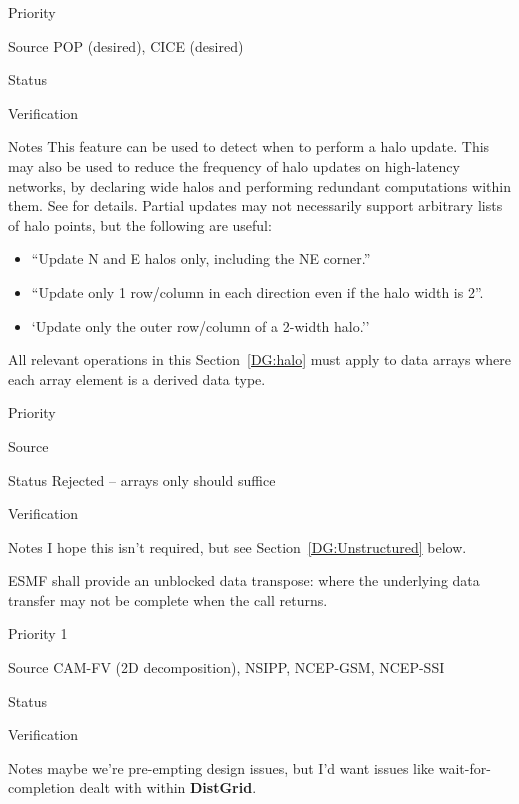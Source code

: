 \begin{reqlist}
\item[Priority]
\item[Source] POP (desired), CICE (desired)
\item[Status]
\item[Verification]
\item[Notes] This feature can be used to detect when to perform a halo
  update. This may also be used to reduce the frequency of halo
  updates on high-latency networks, by declaring wide halos and
  performing redundant computations within them. See \cite{ref:b2001}
  for details. Partial updates may not necessarily support
  arbitrary lists of halo points, but the following are useful:
  \begin{itemize}
  \item ``Update N and E halos only, including the NE corner.''
  \item ``Update only 1 row/column in each direction even if the halo
    width is 2''.
  \item `Update only the outer row/column of a 2-width halo.''
  \end{itemize}
\end{reqlist}


All relevant operations in this Section~\ref{DG:halo} must apply to
data arrays where each array element is a derived data type.

\begin{reqlist}
\item[Priority]
\item[Source]
\item[Status] Rejected -- arrays only should suffice
\item[Verification]
\item[Notes] I hope this isn't required, but see
  Section~\ref{DG:Unstructured} below.
\end{reqlist}

 \label{DG:transpose}


ESMF shall provide an unblocked data transpose: where the underlying
data transfer may not be complete when the call returns.

\begin{reqlist}
\item[Priority] 1
\item[Source] CAM-FV (2D decomposition), NSIPP, NCEP-GSM, NCEP-SSI
\item[Status]
\item[Verification]
\item[Notes] maybe we're pre-empting design issues, but I'd want
  issues like wait-for-completion dealt with within \textbf{DistGrid}.
\end{reqlist}

